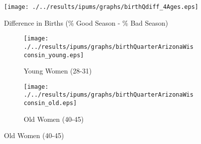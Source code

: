 \begin{figure}[htpb!]
  \begin{center}
  \caption{Difference in Births (\% Good Season - \% Bad Season)}
  \label{fig:NVSSbirthsAgesIPUMS}
  \texttt{[image: ./../results/ipums/graphs/birthQdiff\_4Ages.eps]}
  \end{center}
\end{figure}
\begin{figure}[htpb!]
\begin{center}
\caption{Conceptions by Month (Arizona and Wisconsin)}
\label{fig:conceptionsStatesIPUMS}
\begin{subfigure}{.5\textwidth}
  \centering
  \texttt{[image: ./../results/ipums/graphs/birthQuarterArizonaWisconsin\_young.eps]}
  \caption{Young Women (28-31)}
  \label{fig:conceptionsStatesYoungIPUMS}
\end{subfigure}%
\begin{subfigure}{.5\textwidth}
  \centering
  \texttt{[image: ./../results/ipums/graphs/birthQuarterArizonaWisconsin\_old.eps]}
  \caption{Old Women (40-45)}
  \label{fig:conceptionsStatesOldIPUMS}
\end{subfigure}
\end{center}	
\end{figure}
